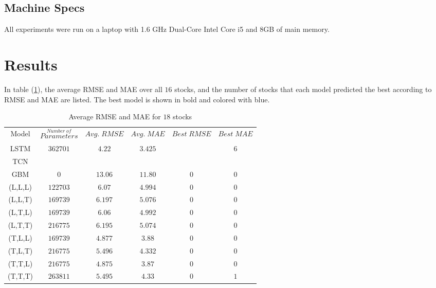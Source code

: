 \documentclass[12pt, A4]{article}
\begin{document}
\subsection{Machine Specs}
All experiments were run on a laptop with 1.6 GHz Dual-Core Intel Core i5 and $8$GB of main memory.

\section{Results}

In table (\ref{Average RMSE_MAE_results}), the average RMSE and MAE over all $16$ stocks, and the number of stocks that each model predicted the best according to RMSE and MAE are listed. The best model is shown in bold and colored with blue.
\begin{table}[H]
	\footnotesize
	\begin{center}
		\begin{tabular}{| c | c | c | c | c | c |}
			\hline 
			Model & $\stackrel{Number\; of}{Parameters}$ & $Avg.\; RMSE$ & $Avg.\; MAE$ & $Best \;RMSE$ & $Best\; MAE$ \\ \cline{1-6}
			LSTM & $362701$& $4.22$ & $3.425$  &\cellcolor{blue!25}  \boldmath{$8$} & $6$ \\ \cline{1-6}
			TCN & \cellcolor{blue!25}  \boldmath{$87937$}&\cellcolor{blue!25}   \boldmath{$3.86$} &\cellcolor{blue!25}   \boldmath{$3.07$} & \cellcolor{blue!25} \boldmath{$8$} & \cellcolor{blue!25}  \boldmath{$9$}  \\ \cline{1-6}
			GBM & $0$ &$13.06$ & $11.80$ & $0$ & $0$ \\ \cline{1-6}
			(L,L,L)& $122703$ & $6.07$ & $4.994$ & $0$ & $0$  \\ \cline{1-6}
			(L,L,T) & $169739$ & $6.197$ & $5.076$  & $0$ & $0$ \\ \cline{1-6}
			(L,T,L) &  $169739$ & $6.06$ & $4.992$  & $0$ & $0$ \\ \cline{1-6}
			(L,T,T) & $216775$ & $6.195$ & $5.074$  & $0$ & $0$ \\ \cline{1-6}
			(T,L,L) & $169739$ & $4.877$ & $3.88$  & $0$ & $0$ \\ \cline{1-6}
			(T,L,T) & $216775$ & $5.496$ & $4.332$  & $0$ & $0$ \\ \cline{1-6}
			(T,T,L) & $216775$ & $4.875$ & $3.87$  & $0$ & $0$ \\ \cline{1-6}
			(T,T,T) & $263811$ & $5.495$ & $4.33$  & $0$ & $1$ \\ \cline{1-6}			
		\end{tabular}
		\caption{Average RMSE and MAE for $18$ stocks} \label{Average RMSE_MAE_results}
	\end{center}
\end{table}
\end{document}
